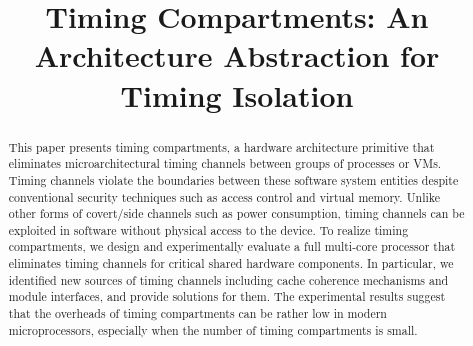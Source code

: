 \title{
    Timing Compartments: An Architecture Abstraction for Timing Isolation
}



\date{}
\maketitle

\thispagestyle{empty}

\begin{abstract}
    This paper presents timing compartments, a hardware architecture primitive 
    that eliminates microarchitectural timing channels between groups of 
    processes or VMs. Timing channels violate the boundaries between these 
    software system entities despite conventional security techniques such as 
    access control and virtual memory. Unlike other forms of covert/side channels such 
    as power consumption, timing channels can be exploited in software without 
    physical access to the device. 
    To realize timing 
    compartments, we design and experimentally evaluate a full multi-core 
    processor that eliminates timing channels for critical shared hardware 
    components. 
    In particular, we identified new sources of timing channels including
    cache coherence mechanisms and module interfaces, and provide solutions for them.
    The experimental results suggest that the overheads of
    timing compartments can be rather low in modern microprocessors, especially 
    when the number of timing compartments is small.

\end{abstract}
